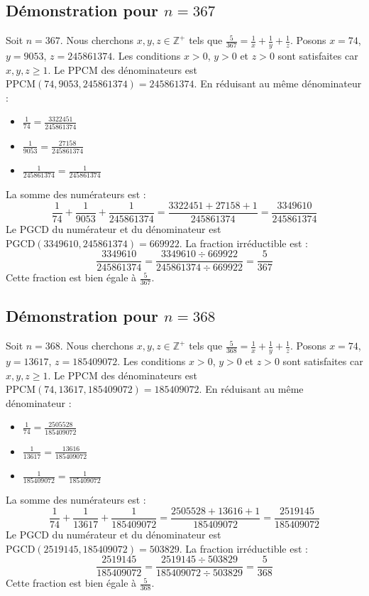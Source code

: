 \documentclass[11pt,a4paper]{article}
\begin{document}
\subsection{Démonstration pour $n = 367$}
Soit $n = 367$. Nous cherchons $x, y, z \in \mathbb{Z}^{+}$ tels que $\frac{5}{367} = \frac{1}{x} + \frac{1}{y} + \frac{1}{z}$.
Posons $x = 74$, $y = 9053$, $z = 245861374$.
Les conditions $x > 0$, $y > 0$ et $z > 0$ sont satisfaites car $x, y, z \geq 1$.
Le PPCM des dénominateurs est $\text{PPCM}(74, 9053, 245861374) = 245861374$.
En réduisant au même dénominateur :
\begin{itemize}
    \item $\frac{1}{74} = \frac{3322451}{245861374}$
    \item $\frac{1}{9053} = \frac{27158}{245861374}$
    \item $\frac{1}{245861374} = \frac{1}{245861374}$
\end{itemize}
La somme des numérateurs est :
$$ \frac{1}{74} + \frac{1}{9053} + \frac{1}{245861374} = \frac{3322451 + 27158 + 1}{245861374} = \frac{3349610}{245861374} $$
Le PGCD du numérateur et du dénominateur est $\text{PGCD}(3349610, 245861374) = 669922$.
La fraction irréductible est :
$$ \frac{3349610}{245861374} = \frac{3349610 \div 669922}{245861374 \div 669922} = \frac{5}{367} $$
Cette fraction est bien égale à $\frac{5}{367}$.

\subsection{Démonstration pour $n = 368$}
Soit $n = 368$. Nous cherchons $x, y, z \in \mathbb{Z}^{+}$ tels que $\frac{5}{368} = \frac{1}{x} + \frac{1}{y} + \frac{1}{z}$.
Posons $x = 74$, $y = 13617$, $z = 185409072$.
Les conditions $x > 0$, $y > 0$ et $z > 0$ sont satisfaites car $x, y, z \geq 1$.
Le PPCM des dénominateurs est $\text{PPCM}(74, 13617, 185409072) = 185409072$.
En réduisant au même dénominateur :
\begin{itemize}
    \item $\frac{1}{74} = \frac{2505528}{185409072}$
    \item $\frac{1}{13617} = \frac{13616}{185409072}$
    \item $\frac{1}{185409072} = \frac{1}{185409072}$
\end{itemize}
La somme des numérateurs est :
$$ \frac{1}{74} + \frac{1}{13617} + \frac{1}{185409072} = \frac{2505528 + 13616 + 1}{185409072} = \frac{2519145}{185409072} $$
Le PGCD du numérateur et du dénominateur est $\text{PGCD}(2519145, 185409072) = 503829$.
La fraction irréductible est :
$$ \frac{2519145}{185409072} = \frac{2519145 \div 503829}{185409072 \div 503829} = \frac{5}{368} $$
Cette fraction est bien égale à $\frac{5}{368}$.
\end{document}
